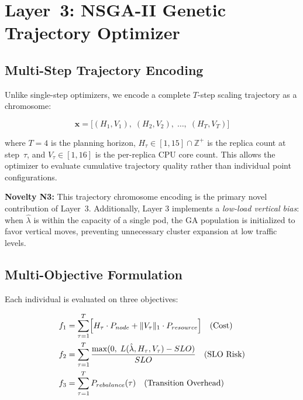 \documentclass[conference]{IEEEtran}
\begin{document}
\section{Layer~3: NSGA-II Genetic Trajectory Optimizer}
\label{sec:layer3}

\subsection{Multi-Step Trajectory Encoding}

Unlike single-step optimizers, we encode a complete $T$-step scaling trajectory as a chromosome:

\begin{equation}
\label{eq:chromosome}
\mathbf{x} = \bigl[(H_1, V_1),\; (H_2, V_2),\; \ldots,\; (H_T, V_T)\bigr]
\end{equation}

\noindent where $T=4$ is the planning horizon, $H_\tau \in [1, 15] \cap \mathbb{Z}^+$ is the replica count at step~$\tau$, and $V_\tau \in [1, 16]$ is the per-replica CPU core count. This allows the optimizer to evaluate cumulative trajectory quality rather than individual point configurations.

\textbf{Novelty N3:} This trajectory chromosome encoding is the primary novel contribution of Layer~3. Additionally, Layer 3 implements a \emph{low-load vertical bias}: when $\hat{\lambda}$ is within the capacity of a single pod, the GA population is initialized to favor vertical moves, preventing unnecessary cluster expansion at low traffic levels.

\subsection{Multi-Objective Formulation}

Each individual is evaluated on three objectives:

\begin{align}
f_1 &= \sum_{\tau=1}^{T} \Bigl[H_\tau \cdot P_{node} + \|V_\tau\|_1 \cdot P_{resource}\Bigr] \quad \text{(Cost)} \label{eq:f1}\\
f_2 &= \sum_{\tau=1}^{T} \frac{\max(0,\; L(\hat{\lambda}, H_\tau, V_\tau) - SLO)}{SLO} \quad \text{(SLO Risk)} \label{eq:f2}\\
f_3 &= \sum_{\tau=1}^{T} P_{rebalance}(\tau) \quad \text{(Transition Overhead)} \label{eq:f3}
\end{align}
\end{document}
